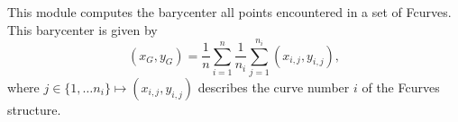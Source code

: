 This module computes the barycenter all points encountered in a set
of Fcurves. This barycenter is given by
$$(x_G,y_G) = \frac{1}{n} \sum_{i=1}^n \frac{1}{n_i} \sum_{j=1}^{n_i} 
(x_{i,j},y_{i,j}),$$
where $j \in \{1,\ldots n_i\} \mapsto (x_{i,j},y_{i,j})$ describes
the curve number $i$ of the Fcurves structure.